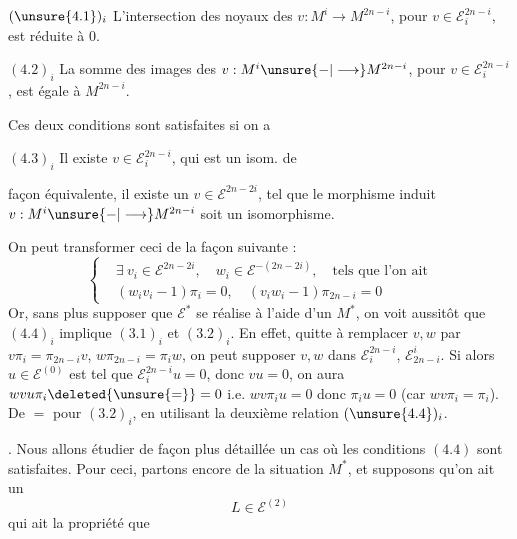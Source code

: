$(\unsure{4.1})_i$ L'intersection des noyaux des $v:M^i\longrightarrow M^{2n-i}$, pour $v\in\mathcal E_i^{2n-i}$, est réduite à $0$.

$(4.2)_i$ La somme des images des $v:M^i\unsure{-|\longrightarrow}M^{2n-i}$, pour $v\in\mathcal E_i^{2n-i}$, est  égale à $M^{2n-i}$.

Ces deux conditions sont satisfaites si on a

$(4.3)_i$ Il existe  $v\in\mathcal E_i^{2n-i}$, qui est un isom. de

façon équivalente, il existe un $v\in\mathcal E^{2n-2i}$, tel que le morphisme induit $v:M^i\unsure{-|\longrightarrow}M^{2n-i}$ soit un isomorphisme.

On peut transformer ceci de la façon suivante :
\[
\left\{\begin{aligned}
&\exists\ v_i\in\mathcal E^{2n-2i},\quad w_i\in\mathcal E^{-(2n-2i)},\quad\text{tels que l'on ait}\\
&(w_iv_i-1)\pi_i=0,\quad(v_iw_i-1)\pi_{2n-i}=0
\end{aligned}\right.
\tag*{$(4.4)_i$}
\]
Or, sans plus supposer que $\mathcal E^*$ se réalise à l'aide d'un $M^*$, on voit aussitôt que $(4.4)_i$ implique $(3.1)_i$ et $(3.2)_i$. En effet, quitte à remplacer $v,w$ par $v\pi_i=\pi_{2n-i}v$, $w\pi_{2n-i}=\pi_iw$, on peut supposer $v,w$ dans $\mathcal E_i^{2n-i}$, $\mathcal E_{2n-i}^i$. Si alors  $u\in\mathcal E^{(0)}$ est tel que $\mathcal E_i^{2n-i}u=0$, donc $vu=0$, on aura $wvu\pi_i\deleted{\unsure{=}}=0$ i.e. $wv\pi_i u=0$ donc $\pi_i u=0$ (car $wv\pi_i=\pi_i$). De $=$ pour $(3.2)_i$, en utilisant la deuxième relation $(\unsure{4.4})_i$.


. Nous allons étudier de façon plus détaillée un cas où les conditions $(4.4)$ sont satisfaites. Pour ceci, partons encore de la situation $M^*$,  et supposons qu'on ait un
\[
L\in\mathcal E^{(2)}
\tag{6.0}
\]
qui ait la propriété que

